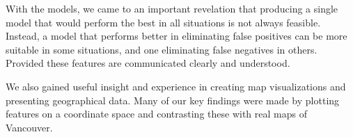 With the models, we came to an important revelation that producing a single model that would perform the best in all situations is not always feasible. Instead, a model that performs better in eliminating false positives can be more suitable in some situations, and one eliminating false negatives in others. Provided these features are communicated clearly and understood.

We also gained useful insight and experience in creating map visualizations and presenting geographical data. Many of our key findings were made by plotting features on a coordinate space and contrasting these with real maps of Vancouver.
